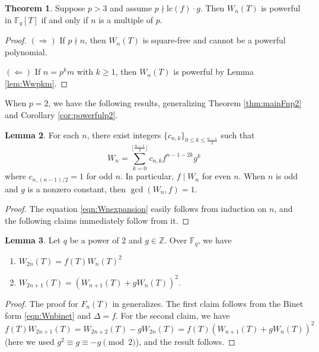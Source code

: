 \documentclass[letterpaper, 10pt]{article}
\newcommand{\lc}{\mathrm{lc}}
\newcommand{\bF}{\mathbb{F}}
\newcommand{\bZ}{\mathbb{Z}}
\newcommand{\1}{\mathds{1}}	%
\theoremstyle{definition}
\newtheorem{theorem}{Theorem}[section]
\newtheorem{lemma}[theorem]{Lemma}
\theoremstyle{remark}
\begin{document}
\begin{theorem}
    \label{thm:Wn_powerful}
    Suppose $p > 3$ and assume $p \nmid \lc(f) \cdot g$.
    Then \(W_n(T)\) is powerful in \(\bF_q[T]\) if and only if $n$ is a multiple of $p$.
\end{theorem}

\begin{proof}
    $(\Rightarrow)$ If $p \nmid n$, then $W_n(T)$ is square-free and cannot be a powerful polynomial.

    $(\Leftarrow)$ If $n = p^k m$ with $k \ge 1$, then $W_n(T)$ is powerful by Lemma \ref{lem:Wwpkm}.
\end{proof}

When $p = 2$, we have the following results, generalizing Theorem \ref{thm:mainFnp2} and Corollary \ref{cor:powerfulp2}.
\begin{lemma}
    \label{lem:Wnexpansion}
    For each $n$, there exist integers $\{c_{n, k}\}_{0 \le k \le \frac{n-1}{2}}$ such that
    \begin{equation}
        \label{eqn:Wnexpansion}
        W_n = \sum_{k=0}^{\lfloor\frac{n-1}{2}\rfloor} c_{n, k} f^{n-1 - 2k} g^k
    \end{equation}
    where $c_{n, (n-1)/2} = 1$ for odd $n$.
    In particular, $f \mid W_{n}$ for even $n$.
    When $n$ is odd and $g$ is a nonzero constant, then $\gcd(W_{n}, f) = 1$.
\end{lemma}
\begin{proof}
    The equation \eqref{eqn:Wnexpansion} easily follows from induction on $n$, and the following claims immediately follow from it.
\end{proof}

\begin{lemma}
    \label{lem:Wnsquare}
    Let $q$ be a power of 2 and $g \in \bZ$. Over $\bF_q$, we have
    \begin{enumerate}
        \item $W_{2n}(T) = f(T) W_n(T)^2$
        \item $W_{2n+1}(T) = (W_{n+1}(T) + g W_{n}(T))^2$.
    \end{enumerate}
\end{lemma}
\begin{proof}
    The proof for $F_n(T)$ in \cite[Lemma 3.5]{kitayama2017irreducibility} generalizes.
    The first claim follows from the Binet form \eqref{eqn:Wnbinet} and $\Delta = f$. 
    For the second claim, we have $f(T) W_{2n+1}(T) = W_{2n+2}(T) - g W_{2n}(T) = f(T)(W_{n+1}(T) + g W_{n}(T))^2$ (here we used $g^2 \equiv g \equiv -g\pmod{2}$), and the result follows.
\end{proof}
\end{document}
